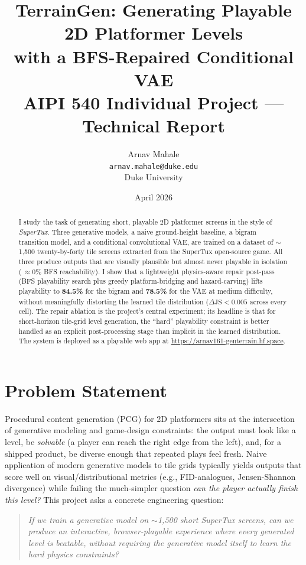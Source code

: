 \documentclass[11pt]{article}
\title{\textbf{TerrainGen: Generating Playable 2D Platformer Levels\\
with a BFS-Repaired Conditional VAE}\\
\normalsize{AIPI 540 Individual Project --- Technical Report}}
\author{Arnav Mahale\\
\texttt{arnav.mahale@duke.edu}\\
Duke University}
\date{April 2026}
\begin{document}
\maketitle

\begin{abstract}
I study the task of generating short, playable 2D platformer screens in the
style of \emph{SuperTux}. Three generative models, a naive ground-height
baseline, a bigram transition model, and a conditional convolutional VAE,
are trained on a dataset of $\sim$1{,}500 twenty-by-forty tile screens
extracted from the SuperTux open-source game. All three produce outputs
that are visually plausible but almost never playable in isolation
(\,$\approx$0\% BFS reachability). I show that a lightweight
physics-aware repair post-pass (BFS playability search plus greedy
platform-bridging and hazard-carving) lifts playability to
\textbf{84.5\%} for the bigram and \textbf{78.5\%} for the VAE at
medium difficulty, without meaningfully distorting the learned tile
distribution (\(\Delta\text{JS} < 0.005\) across every cell). The
repair ablation is the project's central experiment; its headline
is that for short-horizon tile-grid level generation, the ``hard''
playability constraint is better handled as an explicit
post-processing stage than implicit in the learned distribution. The
system is deployed as a playable web app at
\url{https://arnav161-genterrain.hf.space}.
\end{abstract}

\section{Problem Statement}

Procedural content generation (PCG) for 2D platformers sits at the
intersection of generative modeling and game-design constraints: the
output must look like a level, be \emph{solvable} (a player can reach
the right edge from the left), and, for a shipped product, be
diverse enough that repeated plays feel fresh. Naive application of
modern generative models to tile grids typically yields outputs that
score well on visual/distributional metrics (e.g., FID-analogues,
Jensen-Shannon divergence) while failing the much-simpler question
\emph{can the player actually finish this level?} This project asks a
concrete engineering question:

\begin{quote}
\emph{If we train a generative model on $\sim$1{,}500 short SuperTux
screens, can we produce an interactive, browser-playable experience
where every generated level is beatable, without requiring the
generative model itself to learn the hard physics constraints?}
\end{quote}
\end{document}
